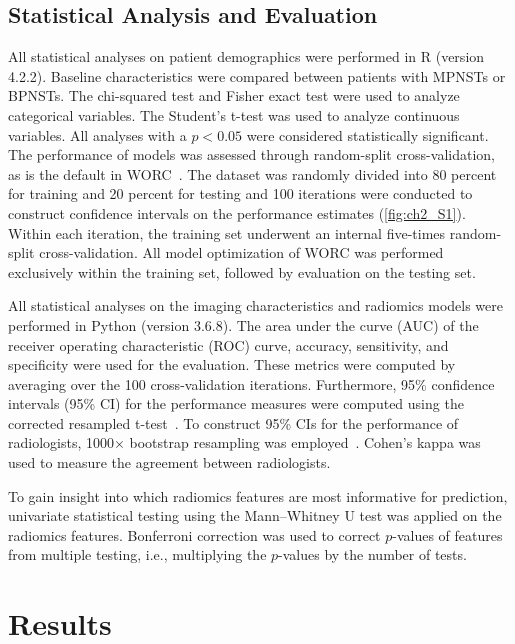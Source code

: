 \subsection{Statistical Analysis and Evaluation}
All statistical analyses on patient demographics were performed in R (version 4.2.2).
Baseline characteristics were compared between patients with MPNSTs or BPNSTs.
The chi-squared test and Fisher exact test were used to analyze categorical variables.
The Student's t-test was used to analyze continuous variables.
All analyses with a $p < 0.05$ were considered statistically significant.
The performance of models was assessed through random-split cross-validation, as is the default in WORC~\autocite{starmans2021}.
The dataset was randomly divided into 80 percent for training and 20 percent for testing and 100 iterations were conducted to construct confidence intervals on the performance estimates (\autoref{fig:ch2_S1}).
Within each iteration, the training set underwent an internal five-times random-split cross-validation.
All model optimization of WORC was performed exclusively within the training set, followed by evaluation on the testing set.

All statistical analyses on the imaging characteristics and radiomics models were performed in Python (version 3.6.8).
The area under the curve (AUC) of the receiver operating characteristic (ROC) curve, accuracy, sensitivity, and specificity were used for the evaluation.
These metrics were computed by averaging over the 100 cross-validation iterations.
Furthermore, 95\% confidence intervals (95\% CI) for the performance measures were computed using the corrected resampled t-test~\autocite{nadeau1999}.
To construct 95\% CIs for the performance of radiologists, 1000$\times$ bootstrap resampling was employed~\autocite{efron1986}.
Cohen's kappa was used to measure the agreement between radiologists.

To gain insight into which radiomics features are most informative for prediction, univariate statistical testing using the Mann--Whitney U test was applied on the radiomics features.
Bonferroni correction was used to correct $p$-values of features from multiple testing, i.e., multiplying the $p$-values by the number of tests.

\section{Results}
